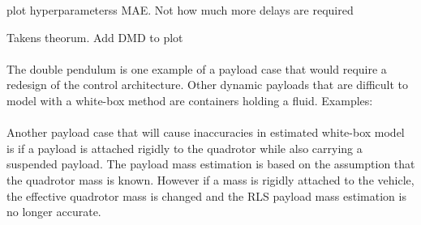         plot hyperparameterss MAE. Not how much more delays are required
        
        Takens theorum.
        Add DMD to plot
        

        \paragraph{}
        The double pendulum is one example of a payload case that would require a redesign of the control architecture.
        Other dynamic payloads that are difficult to model with a white-box method are containers holding a fluid.
        Examples: 

        \paragraph{}
        Another payload case that will cause inaccuracies in estimated white-box model 
        is if a payload is attached rigidly to the quadrotor while also carrying a suspended payload.
        The payload mass estimation is based on the assumption that the quadrotor mass is known.
        However if a mass is rigidly attached to the vehicle, the effective quadrotor mass is changed and the RLS payload mass estimation is no longer accurate.

